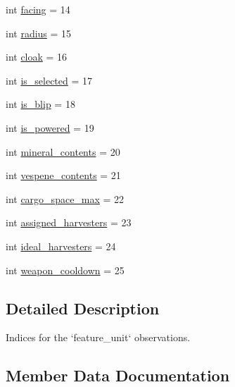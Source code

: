 \begin{DoxyCompactItemize}
\item 
int \mbox{\hyperlink{classpysc2_1_1lib_1_1features_1_1_feature_unit_a45067cf8a883cd2233ba0462565890a2}{facing}} = 14
\item 
int \mbox{\hyperlink{classpysc2_1_1lib_1_1features_1_1_feature_unit_a9b25b2fc95c9397202c1e7912cb63320}{radius}} = 15
\item 
int \mbox{\hyperlink{classpysc2_1_1lib_1_1features_1_1_feature_unit_a21224cb1c4d2caabdcc9806cd59a02cb}{cloak}} = 16
\item 
int \mbox{\hyperlink{classpysc2_1_1lib_1_1features_1_1_feature_unit_a64bce8f6b2d9f64bf4a372f5aa6cf220}{is\+\_\+selected}} = 17
\item 
int \mbox{\hyperlink{classpysc2_1_1lib_1_1features_1_1_feature_unit_a3dbaac94007fad92391a89a2bc4190cc}{is\+\_\+blip}} = 18
\item 
int \mbox{\hyperlink{classpysc2_1_1lib_1_1features_1_1_feature_unit_a905c1fab12f9fb2c3cfe564d63fd8ba0}{is\+\_\+powered}} = 19
\item 
int \mbox{\hyperlink{classpysc2_1_1lib_1_1features_1_1_feature_unit_a92bb15e577996b56367e18a5eade17c7}{mineral\+\_\+contents}} = 20
\item 
int \mbox{\hyperlink{classpysc2_1_1lib_1_1features_1_1_feature_unit_a351e5ddcbd5c0f193846c37757d2ea5e}{vespene\+\_\+contents}} = 21
\item 
int \mbox{\hyperlink{classpysc2_1_1lib_1_1features_1_1_feature_unit_a7ed363d7533c5e87093934c9e8d95d56}{cargo\+\_\+space\+\_\+max}} = 22
\item 
int \mbox{\hyperlink{classpysc2_1_1lib_1_1features_1_1_feature_unit_aad54c92e27aa800d72f03170ad0bb57c}{assigned\+\_\+harvesters}} = 23
\item 
int \mbox{\hyperlink{classpysc2_1_1lib_1_1features_1_1_feature_unit_ae768c5813efa8a31ee72fffb3cb51e6f}{ideal\+\_\+harvesters}} = 24
\item 
int \mbox{\hyperlink{classpysc2_1_1lib_1_1features_1_1_feature_unit_aa7f016cfc4f741c5998152568f1293d8}{weapon\+\_\+cooldown}} = 25
\end{DoxyCompactItemize}


\subsection{Detailed Description}
\begin{DoxyVerb}Indices for the `feature_unit` observations.\end{DoxyVerb}
 

\subsection{Member Data Documentation}
\mbox{\label{classpysc2_1_1lib_1_1features_1_1_feature_unit_a1851bf7e1192818d533104abefb9bebe}} 
